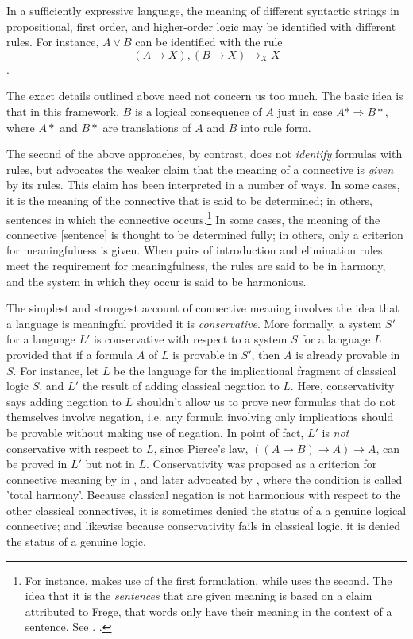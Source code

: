 \documentclass[]{article}
\begin{document}
In a sufficiently expressive language, the meaning of different syntactic strings in propositional, first order, and higher-order logic may be identified with different rules. For instance, $A\vee B$ can be identified with the rule \[(A\rightarrow X), (B\rightarrow X) \rightarrow_{X} X\]. 

The exact details outlined above need not concern us too much. The basic idea is that in this framework, $B$ is a logical consequence of $A$ just in case $A* \Rightarrow B*$, where $A*$ and $B*$ are translations of $A$ and $B$ into rule form.

The second of the above approaches, by contrast, does not  \textit{identify} formulas with rules, but advocates the weaker claim that the meaning of a connective is \textit{given} by its rules. This claim has been interpreted in a number of ways. In some cases, it is the meaning of the connective that is said to be determined; in others, sentences in which the connective occurs.\footnote{For instance, \cite{Read2010} makes use of the first formulation, while \cite[162]{Prawitz1985} uses the second. The idea that it is the \textit{sentences} that are given meaning is based on a claim attributed to Frege, that words only have their meaning in the context of a sentence. See \cite{Frege1948}. \cite[308]{Davidson1967}.} In some cases, the meaning of the connective [sentence] is thought to be determined fully; in others, only a criterion for meaningfulness is given. When pairs of introduction and elimination rules meet the requirement for meaningfulness, the rules are said to be in harmony, and the system in which they occur is said to be harmonious.

The simplest and strongest account of connective meaning involves the idea that a language is meaningful provided it is \textit{conservative}. More formally, a system $S'$ for a language $L'$ is conservative with respect to a system $S$ for a language $L$ provided that if a formula $A$ of $L$ is provable in $S'$, then $A$ is already provable in $S$. For instance, let $L$ be the language for the implicational fragment of classical logic $S$, and $L'$ the result of adding classical negation to $L$. Here, conservativity says adding negation to $L$ shouldn't allow us to prove new formulas that do not themselves involve negation, i.e. any formula involving only implications should be provable without making use of negation. In point of fact, $L'$ is \textit{not} conservative with respect to $L$, since Pierce's law, $((A\rightarrow B)\rightarrow A) \rightarrow A$, can be proved in $L'$ but not in $L$. Conservativity was proposed as a criterion for connective meaning by in \cite{Belnap1962}, and later advocated by \cite{Dummett1991}, where the condition is called 'total harmony'. Because classical negation is not harmonious with respect to the other classical connectives, it is sometimes denied the status of a a genuine logical connective; and likewise because conservativity fails in classical logic, it is denied the status of a genuine logic.
\end{document}
